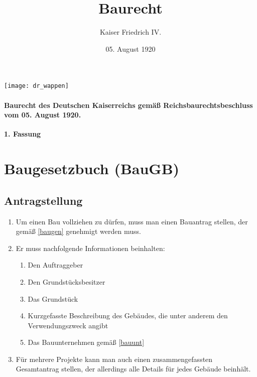 \documentclass{article}
\title{Baurecht}
\author{Kaiser Friedrich IV.}
\date{05. August 1920}
\begin{document}
\maketitle
\begin{center}
    \texttt{[image: dr\_wappen]}
\end{center}
\vspace*{\fill}
\paragraph{Baurecht des Deutschen Kaiserreichs gemäß Reichsbaurechtsbeschluss vom 05. August 1920.}

\newpage
{}
\vspace*{\fill}
\begin{Center}
\textbf{1. Fassung}
\vspace*{\fill}
\end{Center}
\newpage
\tableofcontents
\newpage
\section{Baugesetzbuch (BauGB)}
\localtableofcontents

\subsection{Antragstellung}
\begin{enumerate}[(1)]
    \item Um einen Bau vollziehen zu dürfen, muss man einen Bauantrag stellen, der gemäß \ref{baugen} genehmigt werden muss.
    \item Er muss nachfolgende Informationen beinhalten:
    \begin{enumerate}[1.]
        \item Den Auftraggeber
        \item Den Grundstücksbesitzer
        \item Das Grundstück
        \item Kurzgefasste Beschreibung des Gebäudes, die unter anderem den Verwendungszweck angibt
        \item Das Bauunternehmen gemäß \ref{bauunt}
    \end{enumerate}
    \item Für mehrere Projekte kann man auch einen zusammengefassten Gesamtantrag stellen, der allerdings alle Details für jedes Gebäude beinhält.
\end{enumerate}
\end{document}
